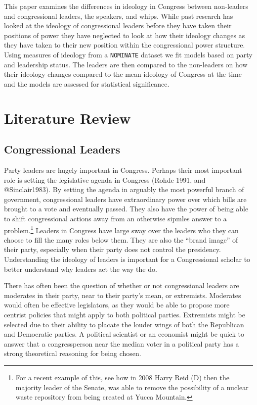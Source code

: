 \documentclass[12pt,twoside]{reedthesis}
\begin{document}
  This paper examines the differences in ideology in Congress between
  non-leaders and congressional leaders, the speakers, and whips. While
  past research has looked at the ideology of congressional leaders before
  they have taken their positions of power they have neglected to look at
  how their ideology changes as they have taken to their new position
  within the congressional power structure. Using measures of ideology
  from a \texttt{NOMINATE} dataset we fit models based on party and
  leadership status. The leaders are then compared to the non-leaders on
  how their ideology changes compared to the mean ideology of Congress at
  the time and the models are assessed for statistical significance.
  
  \chapter{Literature Review}\label{literature-review}
  
  \section{Congressional Leaders}\label{congressional-leaders}
  
  Party leaders are hugely important in Congress. Perhaps their most
  important role is setting the legislative agenda in Congress (Rohde
  1991, and @Sinclair1983). By setting the agenda in arguably the most
  powerful branch of government, congressional leaders have extraordinary
  power over which bills are brought to a vote and eventually passed. They
  also have the power of being able to shift congressional actions away
  from an otherwise sipmles answer to a problem.\footnote{For a recent
    example of this, see how in 2008 Harry Reid (D) then the majority
    leader of the Senate, was able to remove the possibility of a nuclear
    waste repository from being created at Yucca Mountain.} Leaders in
  Congress have large sway over the leaders who they can choose to fill
  the many roles below them. They are also the ``brand image'' of their
  party, especially when their party does not control the presidency.
  Understanding the ideology of leaders is important for a Congressional
  scholar to better understand why leaders act the way the do.
  
  There has often been the question of whether or not congressional
  leaders are moderates in their party, near to their party's mean, or
  extremists. Moderates would often be effective legislators, as they
  would be able to propose more centrist policies that might apply to both
  political parties. Extremists might be selected due to their ability to
  placate the louder wings of both the Republican and Democratic parties.
  A political scientist or an economist might be quick to answer that a
  congressperson near the median voter in a political party has a strong
  theoretical reasoning for being chosen.
  
\end{document}
